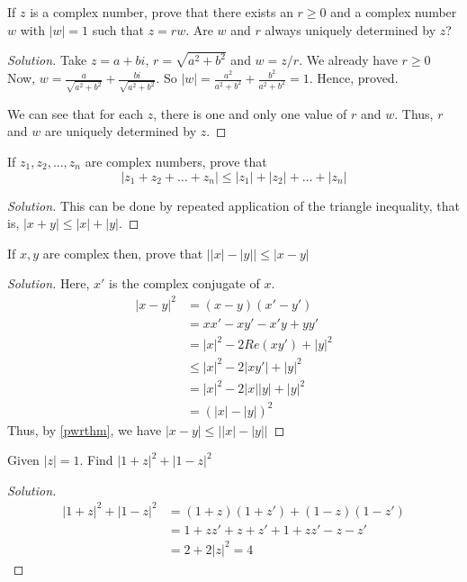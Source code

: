 \begin{prblm}
	If $z$ is a complex number, prove that there exists an $r \geq 0$ and a complex number $w$ with $|w| = 1$
	such that $z = rw$. Are $w$ and $r$ always uniquely determined by $z$?
	\begin{proof}[Solution]
		Take $z = a + bi$, $r = \sqrt{a^2 + b^2}$ and $w = z / r$. We already have $r \geq 0$
		Now, $w = \frac{a}{\sqrt{a^2+b^2}} + \frac{bi}{\sqrt{a^2+b^2}}$.
		So $|w| = \frac{a^2}{a^2+b^2} + \frac{b^2}{a^2+b^2} = 1$. Hence, proved.

		We can see that for each $z$, there is one and only one value of $r$ and $w$.
		Thus, $r$ and $w$ are uniquely determined by $z$.

	\end{proof}
\end{prblm}


\begin{prblm}
	If $z_1, z_2, \dots, z_n$ are complex numbers, prove that
	$$ | z_1 + z_2 + \dots + z_n | \leq |z_1| + |z_2| + \dots + |z_n| $$
	\begin{proof}[Solution]
		This can be done by repeated application of the triangle inequality, that is,
		$|x + y| \leq |x| + |y|$.
	\end{proof}
\end{prblm}

\begin{prblm}
	If $x, y$ are complex then, prove that $\big| |x| - |y| \big| \leq |x - y|$
	\begin{proof}[Solution]
		Here, $x'$ is the complex conjugate of $x$.
		\begin{align*}
		|x-y|^2
			& = (x-y)(x'-y') \\
			& = xx' - xy' - x'y + yy' \\
			& = |x|^2 - 2Re(xy') + |y|^2 \\
			& \leq |x|^2 -2|xy'| + |y|^2 \\
			& = |x|^2 - 2|x||y| + |y|^2 \\
			& = (|x| - |y|)^2
		\end{align*}
		Thus, by \ref{pwrthm}, we have $|x-y| \leq \big| |x|-|y| \big|$
	\end{proof}
\end{prblm}


\begin{prblm}
	Given $|z| = 1$. Find $|1+z|^2 + |1-z|^2$
	\begin{proof}[Solution]
		\begin{align*}
		|1+z|^2 + |1-z|^2
			& = (1+z)(1+z') + (1-z)(1-z') \\
			& = 1 + zz' + z + z' + 1 + zz' - z - z' \\
			& = 2 + 2|z|^2 = 4
		\end{align*}
	\end{proof}
\end{prblm}


